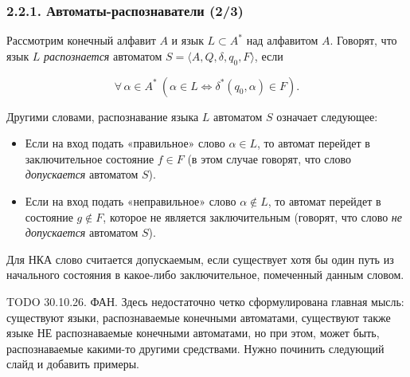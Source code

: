 \documentclass[mathserif,12pt,aspectratio=169]{beamer}
\def\emразделенной{\em разделенной}
\renewcommand{\index}[1]{}
\def\em#1{\it\color{blue}#1}
\def\odmkey#1#2{{\it\color{red} #1}\index{#2}}
\let\Equiv\Longleftrightarrow
\def\A#1#2{\forall\,#1\ \left(#2\right)}
\def\TODO#1{{\color{gray} TODO {#1}}}
\begin{document}
\begin{frame}
\frametitle{2.2.1. Автоматы-распознаватели (2/3)}

Рассмотрим конечный алфавит $A$ и язык $L\subset A^*$ над алфавитом $A$.
Говорят, что язык $L$ \odmkey{распознается}{Распознавание!языка}
автоматом $S=\langle A, Q, \delta, q_0, F\rangle$, если

\vspace{-10pt}
$$
\A{\alpha\in A^* }{\alpha\in L \Equiv
\delta^*(q_0,\alpha)\in F}.
$$

\vspace{-4pt}

Другими словами, распознавание языка $L$ автоматом $S$ означает следующее:
\begin{itemize}
    \item Если на вход подать «правильное» слово $\alpha\in L$, 
    то автомат перейдет в заключительное состояние $f\in F$ 
    (в этом случае говорят, что слово {\em допускается} автоматом $S$).
    \item Если на вход подать «неправильное» слово $\alpha\not\in L$, 
    то автомат перейдет в состояние $g\not\in F$, которое не является заключительным 
    (говорят, что слово {\em не допускается} автоматом $S$).
\end{itemize}

\begin{remark}
Для НКА слово считается допускаемым, если существует хотя бы один 
путь из начального состояния в какое-либо заключительное, 
помеченный данным словом.
\end{remark}


\TODO{30.10.26. ФАН. Здесь недостаточно четко сформулирована главная мысль:
существуют языки, распознаваемые конечными автоматами,
существуют также языке НЕ распознаваемые конечными автоматами,
но при этом, может быть, распознаваемые какими-то другими средствами. 
Нужно починить следующий слайд и добавить примеры. 
}

\end{frame}
\end{document}
